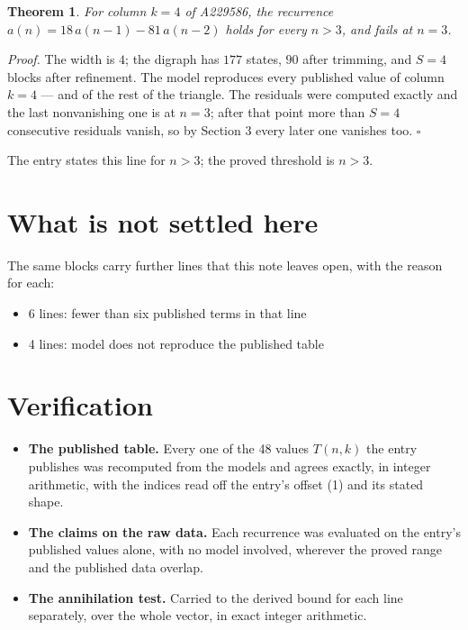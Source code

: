 \documentclass[11pt]{article}
\newtheorem{theorem}{Theorem}
\theoremstyle{definition}
\begin{document}
\begin{theorem} For column $k = 4$ of A229586, the recurrence $a(n) = 18\,a(n-1) - 81\,a(n-2)$ holds for every $n > 3$, and fails at $n = 3$.\end{theorem}

{\itshape Proof.} The width is $4$; the digraph has $177$ states, $90$ after trimming, and $S = 4$ blocks after refinement. The model reproduces every published value of column $k = 4$ --- and of the rest of the triangle. The residuals were computed exactly and the last nonvanishing one is at $n = 3$; after that point more than $S = 4$ consecutive residuals vanish, so by Section 3 every later one vanishes too. $\square$

The entry states this line for $n > 3$; the proved threshold is $n > 3$.

\section{What is not settled here}

The same blocks carry further lines that this note leaves open, with the reason for each:

\begin{itemize}

\item 6 lines: fewer than six published terms in that line

\item 4 lines: model does not reproduce the published table

\end{itemize}

\section{Verification}

\begin{itemize}

\item {\bfseries The published table.} Every one of the 48 values $T(n,k)$ the entry publishes was recomputed from the models and agrees exactly, in integer arithmetic, with the indices read off the entry's offset (1) and its stated shape.

\item {\bfseries The claims on the raw data.} Each recurrence was evaluated on the entry's published values alone, with no model involved, wherever the proved range and the published data overlap.

\item {\bfseries The annihilation test.} Carried to the derived bound for each line separately, over the whole vector, in exact integer arithmetic.

\end{itemize}
\end{document}
